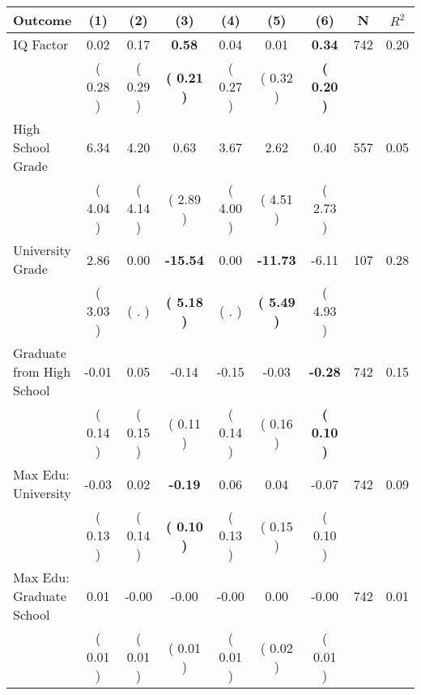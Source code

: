 \begin{tabular}{lcccccccc}
\toprule
 \textbf{Outcome} & \textbf{(1)} & \textbf{(2)} & \textbf{(3)} & \textbf{(4)} & \textbf{(5)} & \textbf{(6)} & \textbf{N} & \textbf{$ R^2$} \\
\midrule
IQ Factor &      0.02 &      0.17 & \textbf{     0.58} &      0.04 &      0.01 & \textbf{     0.34} & 742 &       0.20 \\ 
 & (     0.28 ) & (     0.29 ) & \textbf{(     0.21 )} & (     0.27 ) & (     0.32 ) & \textbf{(     0.20 )} & \\
High School Grade &      6.34 &      4.20 &      0.63 &      3.67 &      2.62 &      0.40 & 557 &       0.05 \\ 
 & (     4.04 ) & (     4.14 ) & (     2.89 ) & (     4.00 ) & (     4.51 ) & (     2.73 ) & \\
University Grade &      2.86 &      0.00 & \textbf{   -15.54} &      0.00 & \textbf{   -11.73} &     -6.11 & 107 &       0.28 \\ 
 & (     3.03 ) & (        . ) & \textbf{(     5.18 )} & (        . ) & \textbf{(     5.49 )} & (     4.93 ) & \\
Graduate from High School &     -0.01 &      0.05 &     -0.14 &     -0.15 &     -0.03 & \textbf{    -0.28} & 742 &       0.15 \\ 
 & (     0.14 ) & (     0.15 ) & (     0.11 ) & (     0.14 ) & (     0.16 ) & \textbf{(     0.10 )} & \\
Max Edu: University &     -0.03 &      0.02 & \textbf{    -0.19} &      0.06 &      0.04 &     -0.07 & 742 &       0.09 \\ 
 & (     0.13 ) & (     0.14 ) & \textbf{(     0.10 )} & (     0.13 ) & (     0.15 ) & (     0.10 ) & \\
Max Edu: Graduate School &      0.01 &     -0.00 &     -0.00 &     -0.00 &      0.00 &     -0.00 & 742 &       0.01 \\ 
 & (     0.01 ) & (     0.01 ) & (     0.01 ) & (     0.01 ) & (     0.02 ) & (     0.01 ) & \\
\bottomrule
\end{tabular}
